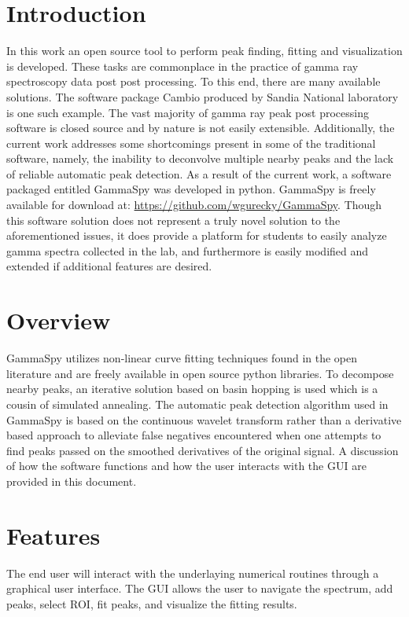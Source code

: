 \documentclass[10pt]{article}
\begin{document}
\section{Introduction}
In this work an open source tool to perform peak finding, fitting and visualization is developed.  These tasks
are commonplace in the practice of gamma ray spectroscopy data post post processing.
To this end, there are many available solutions.  The software
package Cambio produced by Sandia National laboratory is one such example.  The vast majority
of gamma ray peak post processing software is closed source and by nature is not easily extensible.
Additionally, the current work addresses some shortcomings present in some of the traditional
software, namely, the inability to deconvolve multiple nearby peaks and the lack of reliable automatic
peak detection.  As a result of the current work, a software packaged entitled GammaSpy was developed in python.
GammaSpy is freely available for download at: \url{https://github.com/wgurecky/GammaSpy}.  Though
this software solution does not represent a truly novel solution to the aforementioned issues, it does
provide a platform for students to easily analyze gamma spectra collected in the lab, and furthermore
is easily modified and extended if additional features are desired.

\section{Overview}

GammaSpy utilizes non-linear curve fitting techniques found in the open literature and are
freely available in open source python libraries.  To decompose nearby peaks, an iterative solution based
on basin hopping is used which is a cousin of simulated annealing.  The automatic peak detection algorithm
used in GammaSpy is based on the continuous wavelet transform rather than a derivative based approach to alleviate
false negatives encountered when one attempts to find peaks passed on the smoothed derivatives of the original signal.  A discussion of how the software functions and how the
user interacts with the GUI are provided in this document.

\section{Features}

The end user will interact with the underlaying numerical routines through a graphical
user interface. The GUI allows the user to navigate the spectrum, add peaks, select ROI, fit peaks, and visualize
the fitting results.
\end{document}
